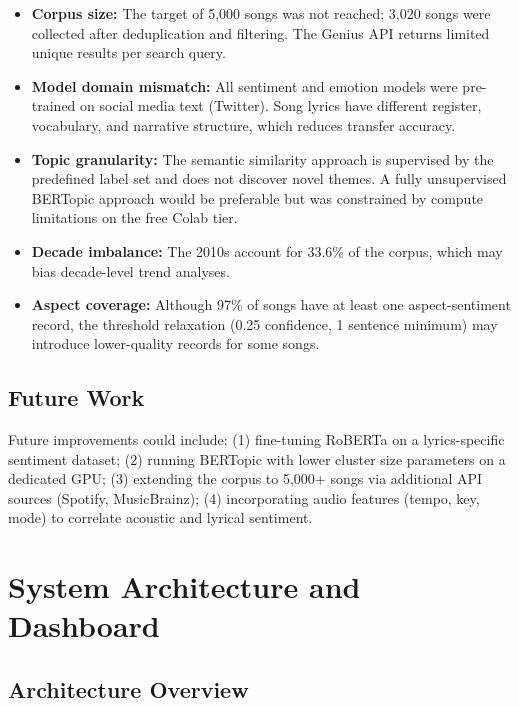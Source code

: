 \documentclass[pdflatex,sn-mathphys-num]{sn-jnl}
\begin{document}
\begin{itemize}[noitemsep]
    \item \textbf{Corpus size:} The target of 5,000 songs was not reached; 3,020 songs were collected after deduplication and filtering. The Genius API returns limited unique results per search query.
    \item \textbf{Model domain mismatch:} All sentiment and emotion models were pre-trained on social media text (Twitter). Song lyrics have different register, vocabulary, and narrative structure, which reduces transfer accuracy.
    \item \textbf{Topic granularity:} The semantic similarity approach is supervised by the predefined label set and does not discover novel themes. A fully unsupervised BERTopic approach would be preferable but was constrained by compute limitations on the free Colab tier.
    \item \textbf{Decade imbalance:} The 2010s account for 33.6\% of the corpus, which may bias decade-level trend analyses.
    \item \textbf{Aspect coverage:} Although 97\% of songs have at least one aspect-sentiment record, the threshold relaxation (0.25 confidence, 1 sentence minimum) may introduce lower-quality records for some songs.
\end{itemize}

\subsection{Future Work}\label{subsec15}

Future improvements could include: (1) fine-tuning RoBERTa on a lyrics-specific sentiment dataset; (2) running BERTopic with lower cluster size parameters on a dedicated GPU; (3) extending the corpus to 5,000+ songs via additional API sources (Spotify, MusicBrainz); (4) incorporating audio features (tempo, key, mode) to correlate acoustic and lyrical sentiment.

\section{System Architecture and Dashboard}\label{sec7}

\subsection{Architecture Overview}\label{subsec16}
\end{document}
